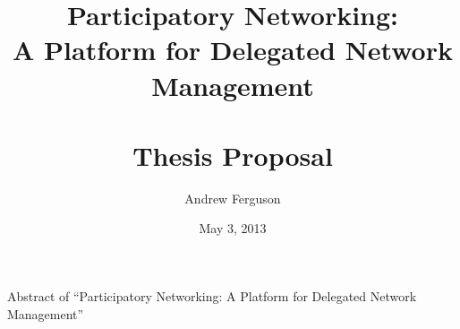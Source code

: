 \documentclass[10pt,oneside,openany]{book}
\begin{document}
\VerbatimFootnotes

\author{Andrew Ferguson}
\title{Participatory Networking: \\ A Platform for Delegated Network Management \\ \ \\ Thesis Proposal}
\date{May 3, 2013}



%

\frontmatter %

\maketitle %
\tableofcontents %

\mainmatter %

\doublespacing

\def\abstract#1{\gdef\d@abstract{#1}}
\def\d@abstract{}
\def\abstractpage{%
  \thispagestyle{empty}
  \noindent Abstract of ``Participatory Networking: A Platform for Delegated Network Management''
  \\
  
  \vfill\newpage}
  
\abstractpage





%



%


%

\backmatter %



\end{document}
